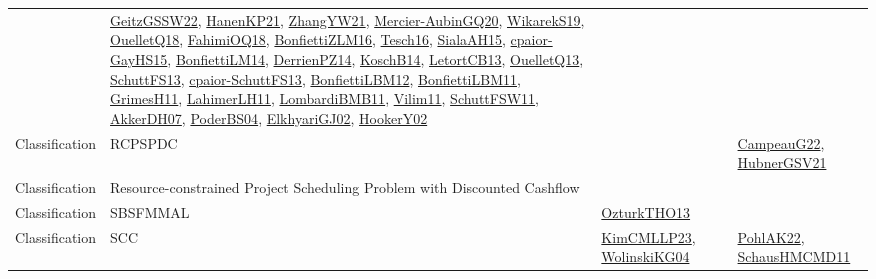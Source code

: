 {\begin{longtable}{lp{3cm}>{\raggedright}p{6cm}>{\raggedright}p{6cm}p{8cm}}
& \href{papers/GeitzGSSW22.pdf}{GeitzGSSW22}\cite{GeitzGSSW22}, \href{papers/HanenKP21.pdf}{HanenKP21}\cite{HanenKP21}, \href{articles/ZhangYW21.pdf}{ZhangYW21}\cite{ZhangYW21}, \href{papers/Mercier-AubinGQ20.pdf}{Mercier-AubinGQ20}\cite{Mercier-AubinGQ20}, \href{articles/WikarekS19.pdf}{WikarekS19}\cite{WikarekS19}, \href{papers/OuelletQ18.pdf}{OuelletQ18}\cite{OuelletQ18}, \href{articles/FahimiOQ18.pdf}{FahimiOQ18}\cite{FahimiOQ18}, \href{papers/BonfiettiZLM16.pdf}{BonfiettiZLM16}\cite{BonfiettiZLM16}, \href{papers/Tesch16.pdf}{Tesch16}\cite{Tesch16}, \href{papers/SialaAH15.pdf}{SialaAH15}\cite{SialaAH15}, \href{papers/cpaior-GayHS15.pdf}{cpaior-GayHS15}\cite{cpaior-GayHS15}, \href{papers/BonfiettiLM14.pdf}{BonfiettiLM14}\cite{BonfiettiLM14}, \href{papers/DerrienPZ14.pdf}{DerrienPZ14}\cite{DerrienPZ14}, \href{papers/KoschB14.pdf}{KoschB14}\cite{KoschB14}, \href{papers/LetortCB13.pdf}{LetortCB13}\cite{LetortCB13}, \href{papers/OuelletQ13.pdf}{OuelletQ13}\cite{OuelletQ13}, \href{papers/SchuttFS13.pdf}{SchuttFS13}\cite{SchuttFS13}, \href{papers/cpaior-SchuttFS13.pdf}{cpaior-SchuttFS13}\cite{cpaior-SchuttFS13}, \href{papers/BonfiettiLBM12.pdf}{BonfiettiLBM12}\cite{BonfiettiLBM12}, \href{papers/BonfiettiLBM11.pdf}{BonfiettiLBM11}\cite{BonfiettiLBM11}, \href{papers/GrimesH11.pdf}{GrimesH11}\cite{GrimesH11}, \href{papers/LahimerLH11.pdf}{LahimerLH11}\cite{LahimerLH11}, \href{papers/LombardiBMB11.pdf}{LombardiBMB11}\cite{LombardiBMB11}, \href{papers/Vilim11.pdf}{Vilim11}\cite{Vilim11}, \href{articles/SchuttFSW11.pdf}{SchuttFSW11}\cite{SchuttFSW11}, \href{papers/AkkerDH07.pdf}{AkkerDH07}\cite{AkkerDH07}, \href{articles/PoderBS04.pdf}{PoderBS04}\cite{PoderBS04}, \href{papers/ElkhyariGJ02.pdf}{ElkhyariGJ02}\cite{ElkhyariGJ02}, \href{papers/HookerY02.pdf}{HookerY02}\cite{HookerY02}\\
Classification & RCPSPDC &  &  & \href{articles/CampeauG22.pdf}{CampeauG22}\cite{CampeauG22}, \href{articles/HubnerGSV21.pdf}{HubnerGSV21}\cite{HubnerGSV21}\\
Classification & Resource-constrained Project Scheduling Problem with Discounted Cashflow &  &  & \\
Classification & SBSFMMAL & \href{articles/OzturkTHO13.pdf}{OzturkTHO13}\cite{OzturkTHO13} &  & \\
Classification & SCC & \href{papers/KimCMLLP23.pdf}{KimCMLLP23}\cite{KimCMLLP23}, \href{papers/WolinskiKG04.pdf}{WolinskiKG04}\cite{WolinskiKG04} &  & \href{articles/PohlAK22.pdf}{PohlAK22}\cite{PohlAK22}, \href{articles/SchausHMCMD11.pdf}{SchausHMCMD11}\cite{SchausHMCMD11}\\

\end{longtable}}
